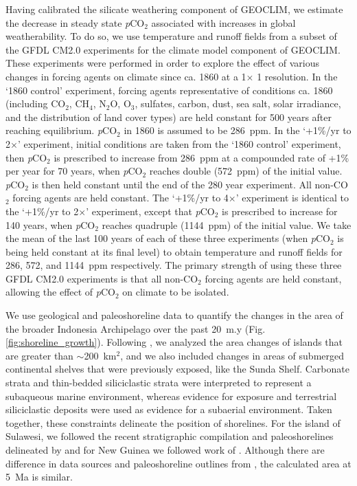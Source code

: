 \documentclass[11pt,letterpaper]{article}
\newcommand{\degrees}{\textdegree\xspace}
\newcommand{\pCOtwo}{\textit{p}CO$_{2}$\xspace}
\newcommand{\COtwo}{CO$_{2}$\xspace}
\begin{document}
Having calibrated the  silicate weathering component of GEOCLIM, we estimate the decrease in steady state \pCOtwo associated with increases in global weatherability. To do so, we use temperature and runoff fields from a subset of the GFDL CM2.0 experiments \citep{Delworth2006a, Delworth2006b} for the climate model component of GEOCLIM. These experiments were performed in order to explore the effect of various changes in forcing agents on climate since ca. 1860 at a 1\degrees $\times$ 1\degrees resolution. In the `1860 control' experiment, forcing agents representative of conditions ca. 1860 (including \COtwo, CH$_{4}$, N$_{2}$O, O$_{3}$, sulfates, carbon, dust, sea salt, solar irradiance, and the distribution of land cover types) are held constant for 500 years after reaching equilibrium. \pCOtwo in 1860 is assumed to be 286~ppm. In the `+1\%/yr to 2$\times$' experiment, initial conditions are taken from the `1860 control' experiment, then \pCOtwo is prescribed to increase from 286~ppm at a compounded rate of +1\% per year for 70 years, when \pCOtwo reaches double (572~ppm) of the initial value. \pCOtwo is then held constant until the end of the 280 year experiment. All non-\COtwo forcing agents are held constant. The `+1\%/yr to 4$\times$' experiment is identical to the `+1\%/yr to 2$\times$' experiment, except that \pCOtwo is prescribed to increase for 140 years, when \pCOtwo reaches quadruple (1144~ppm) of the initial value. We take the mean of the last 100 years of each of these three experiments (when \pCOtwo is being held constant at its final level) to obtain temperature and runoff fields for 286, 572, and 1144~ppm respectively. The primary strength of using these three GFDL CM2.0 experiments is that all non-\COtwo forcing agents are held constant, allowing the effect of \pCOtwo on climate to be isolated.

We use geological and paleoshoreline data to quantify the changes in the area of the broader Indonesia Archipelago over the past 20~m.y (Fig. \ref{fig:shoreline_growth}). Following \citet{Molnar2015a}, we analyzed the area changes of islands that are greater than $\sim$200~km$^{2}$, and we also included changes in areas of submerged continental shelves that were previously exposed, like the Sunda Shelf. Carbonate strata and thin-bedded siliciclastic strata were interpreted to represent a subaqueous marine environment, whereas evidence for exposure and terrestrial siliciclastic deposits were used as evidence for a subaerial environment. Taken together, these constraints delineate the position of shorelines. For the island of Sulawesi, we followed the recent stratigraphic compilation and paleoshorelines delineated by \citet{Nugraha2018a} and for New Guinea we followed work of \citet{Norvick2003a, Harrington2017a, Gold2017a}. Although there are difference in data sources and paleoshoreline outlines from \cite{Molnar2015a}, the calculated area at 5~Ma is similar.
\end{document}
